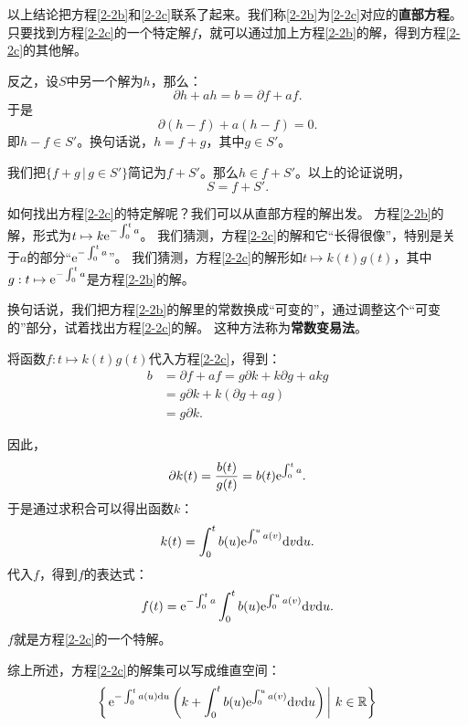 \documentclass[12pt,UTF8]{ctexbook}
\begin{document}
以上结论把方程\eqref{2-2b}和\eqref{2-2c}联系了起来。我们称\eqref{2-2b}为\eqref{2-2c}对应的\textbf{直部方程}。
只要找到方程\eqref{2-2c}的一个特定解$f$，就可以通过加上方程\eqref{2-2b}的解，得到方程\eqref{2-2c}的其他解。

反之，设$S$中另一个解为$h$，那么：
$$ \partial h + a h = b = \partial f + a f. $$
于是
$$ \partial (h - f) + a (h - f) = 0. $$
即$h - f \in S'$。换句话说，$h = f + g$，其中$g\in S'$。

我们把$\{f + g \, | \, g\in S'\}$简记为$f + S'$。那么$h\in f + S'$。以上的论证说明，
$$S = f + S'. $$

如何找出方程\eqref{2-2c}的特定解呢？我们可以从直部方程的解出发。
方程\eqref{2-2b}的解，形式为$t\mapsto k\mathrm{e}^{-\int_0^t a}$。
我们猜测，方程\eqref{2-2c}的解和它“长得很像”，特别是关于$a$的部分“$\mathrm{e}^{-\int_0^t a}$”。
我们猜测，方程\eqref{2-2c}的解形如$t\mapsto k(t) g(t)$，其中$g: t\mapsto \mathrm{e}^{-\int_0^t a}$是方程\eqref{2-2b}的解。

换句话说，我们把方程\eqref{2-2b}的解里的常数换成“可变的”，通过调整这个“可变的”部分，试着找出方程\eqref{2-2c}的解。
这种方法称为\textbf{常数变易法}。

将函数$f: t\mapsto k(t) g(t)$代入方程\eqref{2-2c}，得到：
\begin{align*}
    b &= \partial f + a f = g \partial k + k \partial g + a k g \\
    &= g\partial k + k (\partial g + a g) \\
    &= g\partial k.
\end{align*}

因此，
$$ \partial k(t) = \frac{b(t)}{g(t)} = b(t) \mathrm{e}^{\int_0^t a}. $$
于是通过求积合可以得出函数$k$：
$$ k(t) = \int_0^t b(u) \mathrm{e}^{\int_0^u a(v)}\mathrm{d}v \mathrm{d}u. $$
代入$f$，得到$f$的表达式：
$$ f(t) = \mathrm{e}^{-\int_0^t a} \int_0^t b(u) \mathrm{e}^{\int_0^u a(v)}\mathrm{d}v \mathrm{d}u. $$
$f$就是方程\eqref{2-2c}的一个特解。

综上所述，方程\eqref{2-2c}的解集可以写成维直空间：
$$\left\{\left.\mathrm{e}^{-\int_0^t a(u)\mathrm{d}u} \left(k + \int_0^t b(u) \mathrm{e}^{\int_0^u a(v)}\mathrm{d}v \mathrm{d}u\right) \, \right| \, k\in \mathbb{R}\right\}$$
\end{document}

